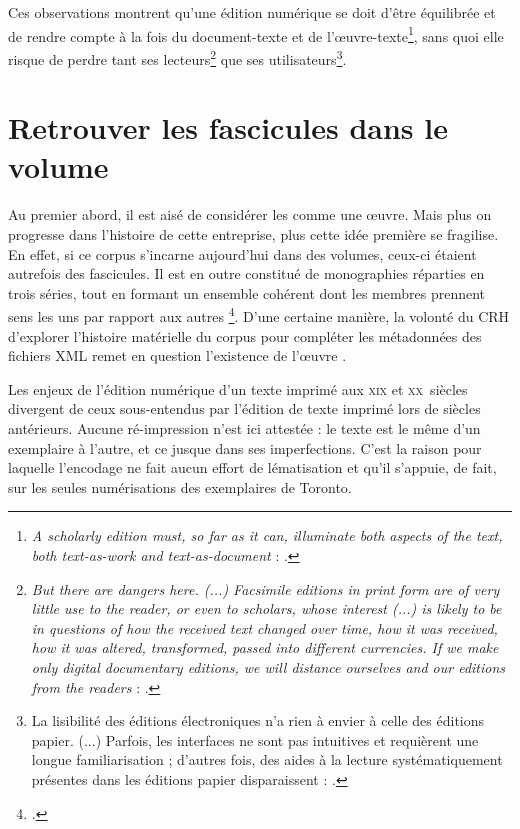 Ces observations montrent qu'une édition numérique se doit d'être équilibrée et de rendre compte à la fois du document-texte et de l'\oe{}uvre-texte\footnote{\og \textit{A scholarly edition must, so far as it can, illuminate both aspects of the text, both text-as-work and text-as-document} \fg{} : \cite[p. 123]{robinson}.}, sans quoi elle risque de perdre tant ses lecteurs\footnote{\og \textit{But there are dangers here. (...) Facsimile editions in print form are of very little use to the reader, or even to scholars, whose interest (...) is likely to be in questions of how the received text changed over time, how it was received, how it was altered, transformed, passed into different currencies. If we make only digital documentary editions, we will distance ourselves and our editions from the readers} \fg{} : \cite[p. 127]{robinson}.} que ses utilisateurs\footnote{\og La lisibilité des éditions électroniques n’a rien à envier à celle des éditions papier. (...) Parfois, les interfaces ne sont pas intuitives et requièrent une longue familiarisation ; d’autres fois, des aides à la lecture systématiquement présentes dans les éditions papier disparaissent \fg{} : \cite[p. 21]{duval}.}.

\section{Retrouver les fascicules dans le volume}

Au premier abord, il est aisé de considérer les \odm{} comme une \oe{}uvre. Mais plus on progresse dans l'histoire de cette entreprise, plus cette idée première se fragilise. En effet, si ce corpus s'incarne aujourd'hui dans des volumes, ceux-ci étaient autrefois des fascicules. Il est en outre constitué de monographies réparties en trois séries, tout en formant un ensemble cohérent dont les membres \og prennent sens les uns par rapport aux autres \fg{}\footcite[p. 5]{chenu}. D'une certaine manière, la volonté du CRH d'explorer l'histoire matérielle du corpus pour compléter les métadonnées des fichiers XML remet en question l'existence de \og l'\oe{}uvre \odm{} \fg{}.

Les enjeux de l'édition numérique d'un texte imprimé aux \textsc{xix}\ieme{} et \textsc{xx}\ieme~siècles divergent de ceux sous-entendus par l'édition de texte imprimé lors de siècles antérieurs. Aucune ré-impression n'est ici attestée : le texte est le même d'un exemplaire à l'autre, et ce jusque dans ses imperfections. C'est la raison pour laquelle l'encodage ne fait aucun effort de lématisation et qu'il s'appuie, de fait, sur les seules numérisations des exemplaires de Toronto.

